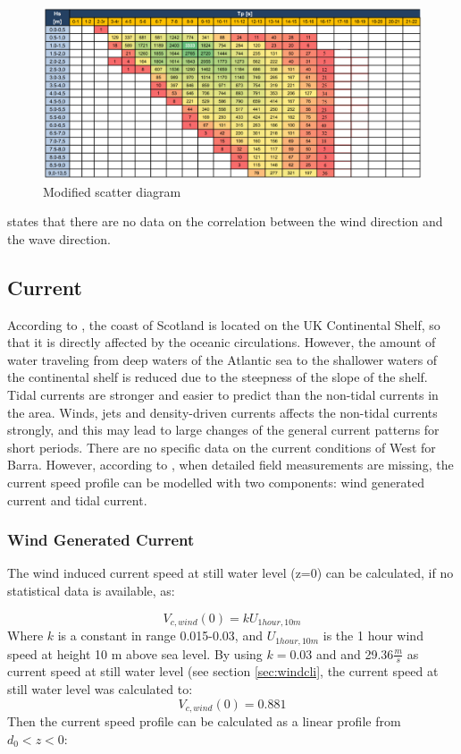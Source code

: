 \begin{figure}[H]
\centering
\includegraphics[scale=0.8]{figures/scatternew}
\caption[$\; \:$Modified scatter diagram ]{Modified scatter diagram  }
 \label{fig:scatn}
\end{figure}
 
 \noindent \cite{Lifes50+D1.1} states that there are no data on the correlation between the wind direction and the wave direction.
 \subsection{Current}
 \label{sec:current}
 According to \cite{Lifes50+D1.1}, the coast of Scotland is located on the UK Continental Shelf, so that it is directly affected by the oceanic circulations. However, the amount of water traveling from deep waters of the Atlantic sea to the shallower waters of the continental shelf is reduced due to the steepness of the slope of the shelf. Tidal currents are stronger and easier to predict than the non-tidal currents in the area. Winds, jets and density-driven currents affects the non-tidal currents strongly, and this may lead to large changes of the general current patterns for short periods. There are no specific data on the current conditions of West for Barra. However, according to \cite{dnvenviroment}, when detailed field measurements are missing, the current speed profile can be modelled with two components: wind generated current and tidal current. \newline
  \newline
  \subsubsection{Wind Generated Current}
  The wind induced current speed at still water level (z=0) can be calculated, if no statistical data is available, as:
  
  \begin{equation}
      V_{c,wind}(0)=k U_{1hour,10m}
  \end{equation}
  Where $k$ is a constant in range 0.015-0.03, and $U_{1hour,10m}$ is the 1 hour wind speed at height 10 m above sea level.\newline
  \newline
  By using $k=0.03$ and and 29.36$\frac{m}{s}$ as current speed at still water level (see section \ref{sec:windcli}, the current speed at still water level was calculated to:\newline
\newline
$$V_{c,wind}(0)=0.881$$   
  Then the current speed profile can be calculated as a linear profile from $d_0 < z < 0$:
  
